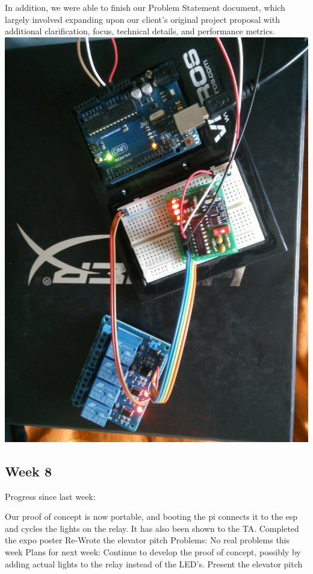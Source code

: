 \documentclass[letterpaper,10pt]{article}
\begin{document}
In addition, we were able to finish our Problem Statement document, which
largely involved expanding upon our client's original project proposal with
additional clarification, focus, technical details, and performance metrics.\\

\includegraphics[scale=0.1]{circuit.jpg}

\subsection{Week 8}
 
Progress since last week: 
 
Our proof of concept is now portable, and booting the pi connects it to the esp and cycles the lights on the relay. It has also been shown to the TA. 
Completed the expo poster 
Re-Wrote the elevator pitch 
Problems: 
No real problems this week 
Plans for next week: 
Continue to develop the proof of concept, possibly by adding actual lights to the relay instead of the LED's. 
Present the elevator pitch 
\end{document}
